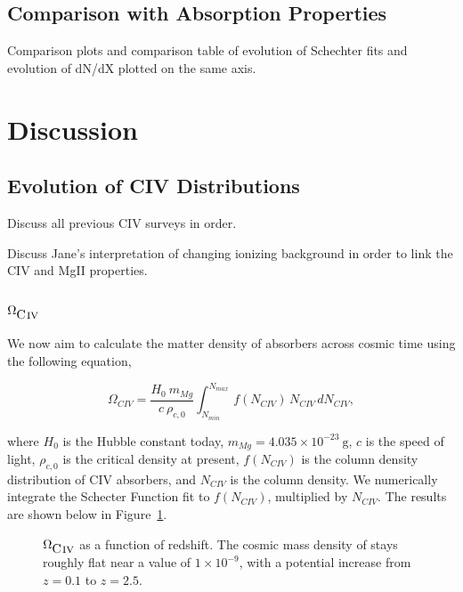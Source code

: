 \documentclass[linenumbers,twocolumn]{aastex61}
\begin{document}
\subsection{Comparison with {\MgII} Absorption Properties}

Comparison plots and comparison table of evolution of Schechter fits and evolution of dN/dX plotted on the same axis.


\section{Discussion}
\label{sec:discussion}

\subsection{Evolution of CIV Distributions}

Discuss all previous CIV surveys in order.

Discuss Jane's interpretation of changing ionizing background in order to link the CIV and MgII properties.

\subsection{$\Omega_{\hbox{{\rm C}\kern 0.1em{\sc iv}}}$}
\label{omegaciv}

We now aim to calculate the matter density of {\CIV} absorbers across cosmic time using the following equation,

\begin{equation}
\Omega_{CIV} = \frac{H_0\  m_{Mg}}{c\ \rho_{c,0}} \int_{N_{min}}^{N_{max}}\, f (N_{CIV})\, N_{CIV}\, dN_{CIV} ,
\label{eqn:omega}
\end{equation}

where $H_0$ is the Hubble constant today, $m_{Mg} = 4.035 \times 10^{-23}~\mathrm{g}$, $c$ is the speed of light, $\rho_{c,0}$ is the critical density at present, $f(N_{CIV})$ is the column density distribution of {CIV} absorbers, and $N_{CIV}$ is the column density. We numerically integrate the Schecter Function fit to $f(N_{CIV})$, multiplied by $N_{CIV}$. The results are shown below in Figure~\ref{fig:omegamgii}.

\begin{figure*}[bth]
\caption{$\Omega_{\hbox{{\rm C}\kern 0.1em{\sc iv}}}$ as a function of redshift. The cosmic mass density of {\CIV} stays roughly flat near a value of $1 \times 10^{-9}$, with a potential increase from $z = 0.1$ to $z = 2.5$.}
\label{fig:omegamgii}
\end{figure*}
\end{document}
